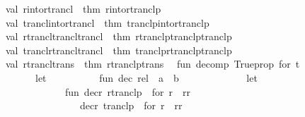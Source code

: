 \begin{isabellebody}
\ \ val\ r{\isacharunderscore}{\kern0pt}into{\isacharunderscore}{\kern0pt}rtrancl\ {\isacharequal}{\kern0pt}\ {\isacharat}{\kern0pt}{\isacharbraceleft}{\kern0pt}thm\ r{\isacharunderscore}{\kern0pt}into{\isacharunderscore}{\kern0pt}rtranclp{\isacharbraceright}{\kern0pt}{\isacharsemicolon}{\kern0pt}\isanewline
\ \ val\ trancl{\isacharunderscore}{\kern0pt}into{\isacharunderscore}{\kern0pt}rtrancl\ {\isacharequal}{\kern0pt}\ {\isacharat}{\kern0pt}{\isacharbraceleft}{\kern0pt}thm\ tranclp{\isacharunderscore}{\kern0pt}into{\isacharunderscore}{\kern0pt}rtranclp{\isacharbraceright}{\kern0pt}{\isacharsemicolon}{\kern0pt}\isanewline
\ \ val\ rtrancl{\isacharunderscore}{\kern0pt}trancl{\isacharunderscore}{\kern0pt}trancl\ {\isacharequal}{\kern0pt}\ {\isacharat}{\kern0pt}{\isacharbraceleft}{\kern0pt}thm\ rtranclp{\isacharunderscore}{\kern0pt}tranclp{\isacharunderscore}{\kern0pt}tranclp{\isacharbraceright}{\kern0pt}{\isacharsemicolon}{\kern0pt}\isanewline
\ \ val\ trancl{\isacharunderscore}{\kern0pt}rtrancl{\isacharunderscore}{\kern0pt}trancl\ {\isacharequal}{\kern0pt}\ {\isacharat}{\kern0pt}{\isacharbraceleft}{\kern0pt}thm\ tranclp{\isacharunderscore}{\kern0pt}rtranclp{\isacharunderscore}{\kern0pt}tranclp{\isacharbraceright}{\kern0pt}{\isacharsemicolon}{\kern0pt}\isanewline
\ \ val\ rtrancl{\isacharunderscore}{\kern0pt}trans\ {\isacharequal}{\kern0pt}\ {\isacharat}{\kern0pt}{\isacharbraceleft}{\kern0pt}thm\ rtranclp{\isacharunderscore}{\kern0pt}trans{\isacharbraceright}{\kern0pt}{\isacharsemicolon}{\kern0pt}\isanewline
\isanewline
\ \ fun\ decomp\ \isactrlConstUNDERSCORE {\isasymopen}Trueprop\ for\ t{\isasymclose}\ {\isacharequal}{\kern0pt}\isanewline
\ \ \ \ \ \ \ \ let\isanewline
\ \ \ \ \ \ \ \ \ \ fun\ dec\ {\isacharparenleft}{\kern0pt}rel\ {\isachardollar}{\kern0pt}\ a\ {\isachardollar}{\kern0pt}\ b{\isacharparenright}{\kern0pt}\ {\isacharequal}{\kern0pt}\isanewline
\ \ \ \ \ \ \ \ \ \ \ \ let\isanewline
\ \ \ \ \ \ \ \ \ \ \ \ \ \ fun\ decr\ \isactrlConstUNDERSCORE {\isasymopen}rtranclp\ {\isacharunderscore}{\kern0pt}\ for\ r{\isasymclose}\ {\isacharequal}{\kern0pt}\ {\isacharparenleft}{\kern0pt}r{\isacharcomma}{\kern0pt}{\isachardoublequote}{\kern0pt}r{\isacharasterisk}{\kern0pt}{\isachardoublequote}{\kern0pt}{\isacharparenright}{\kern0pt}\isanewline
\ \ \ \ \ \ \ \ \ \ \ \ \ \ \ \ {\isacharbar}{\kern0pt}\ decr\ \isactrlConstUNDERSCORE {\isasymopen}tranclp\ {\isacharunderscore}{\kern0pt}\ for\ r{\isasymclose}\ {\isacharequal}{\kern0pt}\ {\isacharparenleft}{\kern0pt}r{\isacharcomma}{\kern0pt}{\isachardoublequote}{\kern0pt}r{\isacharplus}{\kern0pt}{\isachardoublequote}{\kern0pt}{\isacharparenright}{\kern0pt}\isanewline

\end{isabellebody}
